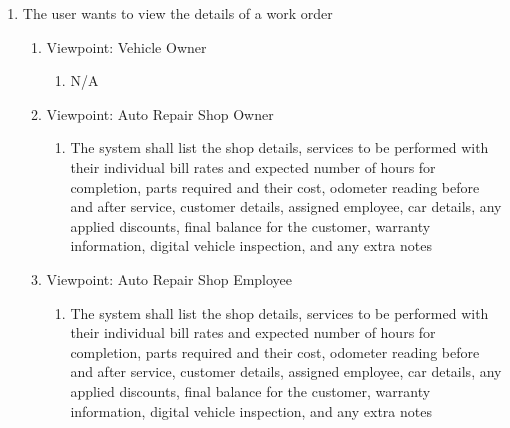 \documentclass[12pt]{article}
\begin{document}
\begin{enumerate}[resume*=business_events]
	\item The user wants to view the details of a work order
	      \begin{enumerate}[VP\arabic*.]
		      \item Viewpoint: Vehicle Owner
		            \begin{enumerate}
			            \item[] N/A
		            \end{enumerate}
		      \item Viewpoint: Auto Repair Shop Owner
		            \begin{enumerate}
			            \item The system shall list the shop details, services to be performed with their individual bill rates
			                  and expected number of hours for completion, parts required and their cost, odometer reading before
			                  and after service, customer details, assigned employee, car details, any applied discounts, final
			                  balance for the customer, warranty information, digital vehicle inspection, and any extra notes
		            \end{enumerate}
		      \item Viewpoint: Auto Repair Shop Employee
		            \begin{enumerate}
			            \item The system shall list the shop details, services to be performed with their individual bill rates
			                  and expected number of hours for completion, parts required and their cost, odometer reading before
			                  and after service, customer details, assigned employee, car details, any applied discounts, final
			                  balance for the customer, warranty information, digital vehicle inspection, and any extra notes
		            \end{enumerate}
	      \end{enumerate}

\end{enumerate}
\end{document}
